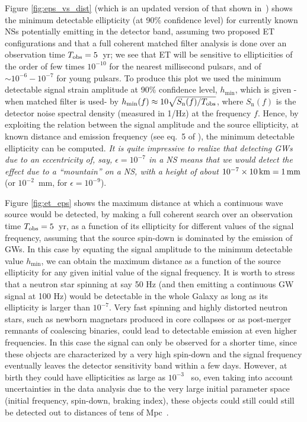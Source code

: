 Figure \ref{fig:eps_vs_dist} (which is an updated version of that shown in~\cite{Abernathy:2011}) shows the minimum detectable ellipticity (at 90$\%$ confidence level) for currently known NSs potentially emitting in the detector band, assuming two proposed ET configurations and that a full coherent matched filter analysis is done over an observation time $T_{\rm obs}=5$~yr; we see that ET will be sensitive to ellipticities of the order of few times  $10^{-10}$ for the nearest millisecond pulsars, and of $\sim 10^{-6}-10^{-7}$ for young pulsars. To produce this plot we used the minimum detectable signal strain amplitude at 90$\%$ confidence level, $h_\text{min}$, which is given -when matched filter is used- by $h_\text{min}(f)\approx 10\sqrt{S_\text{n}(f)/T_{\rm obs}}$, where $S_\text{n}(f)$ is the detector noise spectral density (measured in 1/Hz) at the frequency $f$. Hence, by exploiting the relation between the signal amplitude and the source ellipticity, at known distance and emission frequency (see eq.~5 of \cite{Abadie:2011md}), the minimum detectable ellipticity can be computed.   
{\em It is quite impressive to realize that detecting GWs due to an eccentricity of, say, $\epsilon=10^{-7}$ in a NS means that we would detect the effect  due to a ``mountain'' on a NS, with a  height of about $10^{-7}\times 10\, {\rm km}=1\, {\rm mm}$}
(or $10^{-2}$~mm, for $\epsilon=10^{-9}$).

Figure \ref{fig:et_eps} shows the maximum distance at which a continuous wave source would be detected, by making a full coherent search over an observation time  $T_{\rm obs}=5$~yr, as a function of its ellipticity for different values of the signal frequency, assuming that the source spin-down is dominated by the emission of GWs. In this case by equating the signal amplitude to the minimum detectable value $h_\text{min}$, we can obtain the maximum distance as a function of the source ellipticity for any given initial value of the signal frequency. It is worth to stress that a neutron star spinning at say 50 Hz (and then emitting a continuous GW signal at 100 Hz) would be detectable in the whole Galaxy as long as its ellipticity is larger than $10^{-7}$. 
Very  fast spinning  and highly distorted neutron stars,  such as newborn magnetars produced in core collapses or as post-merger remnants of coalescing binaries, could lead to detectable emission at even higher frequencies. In this case the signal can only be observed for a shorter time, since these objects  
are characterized by a very high spin-down and the signal frequency eventually leaves  the detector sensitivity band within a  few days. However, at birth they could have ellipticities as large as $10^{-3}$~\cite{DallOsso:2018dos} so,  even taking into account uncertainties in the data analysis due to the very large initial parameter space (initial frequency, spin-down, braking index), these objects could still  could still be detected out to distances of tens of Mpc~\cite{Miller:2018rbg}. 

